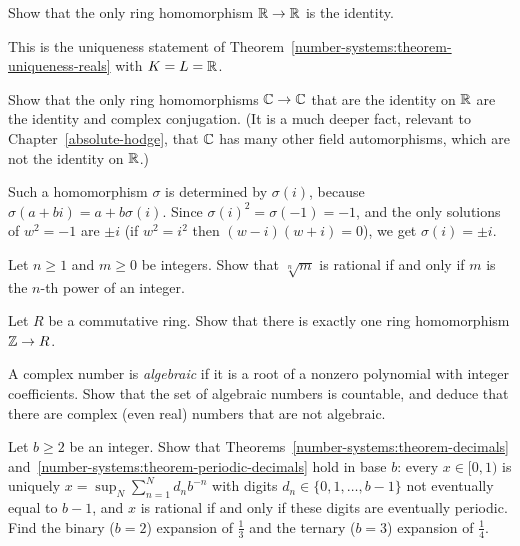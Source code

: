\begin{exercise}\label{number-systems:exercise-ring-endomorphisms-reals}
Show that the only ring homomorphism $\mathbb{R} \to \mathbb{R}$ is the identity.
\end{exercise}

\begin{solution}
This is the uniqueness statement of
Theorem~\ref{number-systems:theorem-uniqueness-reals} with $K = L = \mathbb{R}$.
\end{solution}

\begin{exercise}\label{number-systems:exercise-automorphisms-complex}
Show that the only ring homomorphisms $\mathbb{C} \to \mathbb{C}$ that are the identity on
$\mathbb{R}$ are the identity and complex conjugation. (It is a much deeper fact,
relevant to Chapter~\ref{absolute-hodge}, that $\mathbb{C}$ has many other field
automorphisms, which are not the identity on $\mathbb{R}$.)
\end{exercise}

\begin{solution}
Such a homomorphism $\sigma$ is determined by $\sigma(i)$, because
$\sigma(a + bi) = a + b\sigma(i)$. Since $\sigma(i)^2 = \sigma(-1) = -1$, and the
only solutions of $w^2 = -1$ are $\pm i$ (if $w^2 = i^2$ then $(w - i)(w + i) = 0$),
we get $\sigma(i) = \pm i$.
\end{solution}

\begin{exercise}\label{number-systems:exercise-rational-roots}
Let $n \geq 1$ and $m \geq 0$ be integers. Show that $\sqrt[n]{m}$ is rational if
and only if $m$ is the $n$-th power of an integer.
\end{exercise}

\begin{exercise}\label{number-systems:exercise-integers-initial}
Let $R$ be a commutative ring. Show that there is exactly one ring
homomorphism $\mathbb{Z} \to R$.
\end{exercise}

\begin{exercise}\label{number-systems:exercise-algebraic-numbers}
A complex number is \emph{algebraic} if it is a root of a nonzero polynomial
with integer coefficients. Show that the set of algebraic numbers is
countable, and deduce that there are complex (even real) numbers that are not
algebraic.
\end{exercise}

\begin{exercise}\label{number-systems:exercise-decimal-expansions}
Let $b \geq 2$ be an integer. Show that Theorems~\ref{number-systems:theorem-decimals} and~\ref{number-systems:theorem-periodic-decimals} hold in base $b$: every $x \in [0, 1)$ is uniquely
$x = \sup_N\sum_{n=1}^Nd_nb^{-n}$ with digits $d_n \in \{0, 1, \ldots, b - 1\}$ not eventually equal to $b - 1$, and $x$ is rational if and only if these digits are eventually periodic. Find the binary
($b = 2$) expansion of $\frac13$ and the ternary ($b = 3$) expansion of $\frac14$.
\end{exercise}

